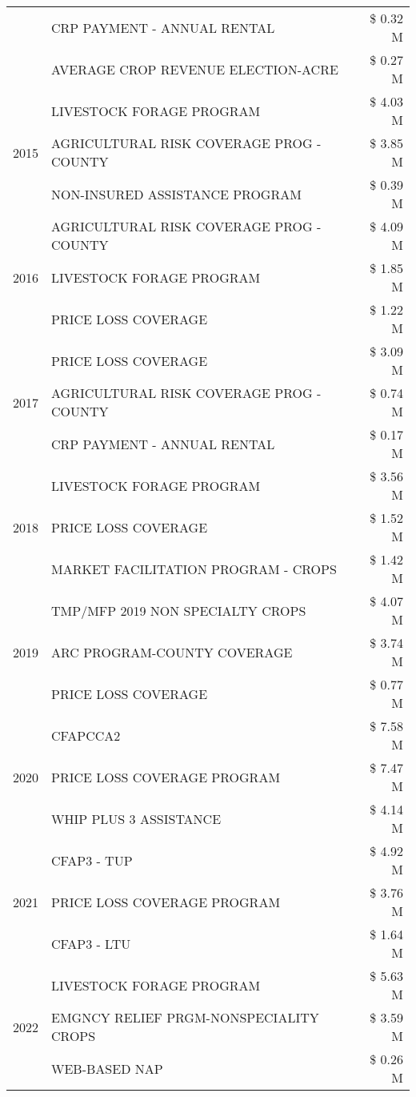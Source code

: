 \begin{tabular}{llr}
 & CRP PAYMENT - ANNUAL RENTAL & \$ 0.32 M \\
 & AVERAGE CROP REVENUE ELECTION-ACRE & \$ 0.27 M \\
\cline{1-3}
\multirow[t]{3}{*}{2015} & LIVESTOCK FORAGE PROGRAM & \$ 4.03 M \\
 & AGRICULTURAL RISK COVERAGE PROG - COUNTY & \$ 3.85 M \\
 & NON-INSURED ASSISTANCE PROGRAM & \$ 0.39 M \\
\cline{1-3}
\multirow[t]{3}{*}{2016} & AGRICULTURAL RISK COVERAGE PROG - COUNTY & \$ 4.09 M \\
 & LIVESTOCK FORAGE PROGRAM & \$ 1.85 M \\
 & PRICE LOSS COVERAGE & \$ 1.22 M \\
\cline{1-3}
\multirow[t]{3}{*}{2017} & PRICE LOSS COVERAGE & \$ 3.09 M \\
 & AGRICULTURAL RISK COVERAGE PROG - COUNTY & \$ 0.74 M \\
 & CRP PAYMENT - ANNUAL RENTAL & \$ 0.17 M \\
\cline{1-3}
\multirow[t]{3}{*}{2018} & LIVESTOCK FORAGE PROGRAM & \$ 3.56 M \\
 & PRICE LOSS COVERAGE & \$ 1.52 M \\
 & MARKET FACILITATION PROGRAM - CROPS & \$ 1.42 M \\
\cline{1-3}
\multirow[t]{3}{*}{2019} & TMP/MFP 2019 NON SPECIALTY CROPS & \$ 4.07 M \\
 & ARC PROGRAM-COUNTY COVERAGE & \$ 3.74 M \\
 & PRICE LOSS COVERAGE & \$ 0.77 M \\
\cline{1-3}
\multirow[t]{3}{*}{2020} & CFAPCCA2 & \$ 7.58 M \\
 & PRICE LOSS COVERAGE PROGRAM & \$ 7.47 M \\
 & WHIP PLUS 3 ASSISTANCE & \$ 4.14 M \\
\cline{1-3}
\multirow[t]{3}{*}{2021} & CFAP3 - TUP & \$ 4.92 M \\
 & PRICE LOSS COVERAGE PROGRAM & \$ 3.76 M \\
 & CFAP3 - LTU & \$ 1.64 M \\
\cline{1-3}
\multirow[t]{3}{*}{2022} & LIVESTOCK FORAGE PROGRAM & \$ 5.63 M \\
 & EMGNCY RELIEF PRGM-NONSPECIALITY CROPS & \$ 3.59 M \\
 & WEB-BASED NAP & \$ 0.26 M \\
\cline{1-3}
\bottomrule
\end{tabular}
